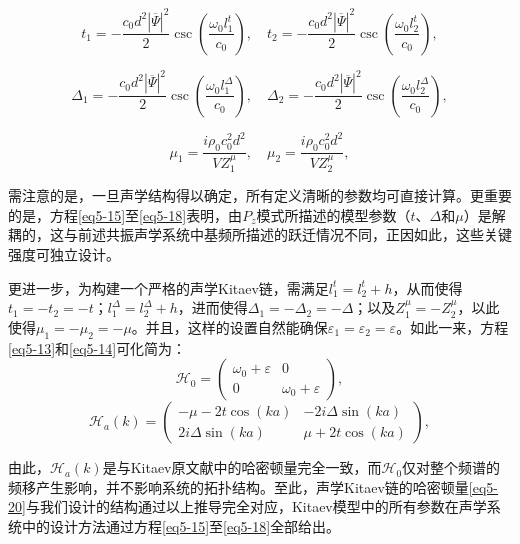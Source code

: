 \begin{equation}\label{eq5-16}
    t_1 = -\frac{c_0d^2|\overline{\Psi}|^2}{2}\csc\left(\frac{\omega_0l_1^t}{c_0}\right), \quad t_2 = -\frac{c_0d^2|\overline{\Psi}|^2}{2}\csc\left(\frac{\omega_0l_2^t}{c_0}\right),
\end{equation}
    
\begin{equation}\label{eq5-17}
    \Delta_1 = -\frac{c_0d^2|\overline{\Psi}|^2}{2}\csc\left(\frac{\omega_0l_1^{\Delta}}{c_0}\right), \quad \Delta_2 = -\frac{c_0d^2|\overline{\Psi}|^2}{2}\csc\left(\frac{\omega_0l_2^{\Delta}}{c_0}\right),
\end{equation}
    
\begin{equation}\label{eq5-18}
    \mu_1 = \frac{i\rho_0c_0^2d^2}{VZ_1^{\mu}}, \quad \mu_2 = \frac{i\rho_0c_0^2d^2}{VZ_2^{\mu}},
\end{equation}

需注意的是，一旦声学结构得以确定，所有定义清晰的参数均可直接计算。更重要的是，方程\ref{eq5-15}至\ref{eq5-18}表明，由$P_z$模式所描述的模型参数（$t$、$\Delta$和$\mu$）是解耦的，这与前述共振声学系统中基频所描述的跃迁情况不同，正因如此，这些关键强度可独立设计。

更进一步，为构建一个严格的声学Kitaev链，需满足$l_1^t = l_2^t + h$，从而使得$t_1 = -t_2 = -t$；$l_1^{\Delta} = l_2^{\Delta} + h$，进而使得$\Delta_1 = -\Delta_2 = -\Delta$；以及$Z_1^{\mu} = -Z_2^{\mu}$，以此使得$\mu_1 = -\mu_2 = -\mu$。并且，这样的设置自然能确保$\varepsilon_1 = \varepsilon_2 = \varepsilon$。如此一来，方程\ref{eq5-13}和\ref{eq5-14}可化简为：
\begin{equation}\label{eq5-19}
    \mathcal{H}_0 = 
    \begin{pmatrix}
    \omega_0 + \varepsilon & 0 \\
    0 & \omega_0 + \varepsilon
    \end{pmatrix},
\end{equation}
\begin{equation}\label{eq5-20}
    \mathcal{H}_a(k) = 
    \begin{pmatrix}
    -\mu - 2t\cos(ka) & -2i\Delta\sin(ka) \\
    2i\Delta\sin(ka) & \mu + 2t\cos(ka)
    \end{pmatrix},
\end{equation}

由此，$\mathcal{H}_a(k)$是与Kitaev原文献中的哈密顿量完全一致\cite{r4}，而$\mathcal{H}_0$仅对整个频谱的频移产生影响，并不影响系统的拓扑结构。至此，声学Kitaev链的哈密顿量\ref{eq5-20}与我们设计的结构通过以上推导完全对应，Kitaev模型中的所有参数在声学系统中的设计方法通过方程\ref{eq5-15}至\ref{eq5-18}全部给出。





